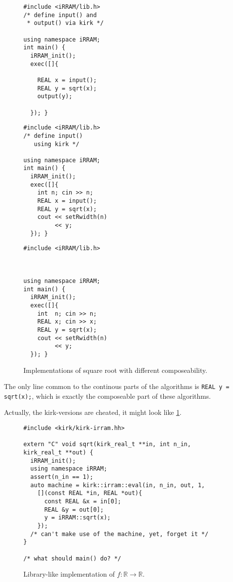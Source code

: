 \documentclass[a4paper,parskip=half]{scrartcl}
\begin{document}
\begin{figure}[h]
\small
\begin{minipage}[b]{.33\linewidth}
\begin{verbatim}
#include <iRRAM/lib.h>
/* define input() and
 * output() via kirk */

using namespace iRRAM;
int main() {
  iRRAM_init();
  exec([]{

    REAL x = input();
    REAL y = sqrt(x);
    output(y);

  }); }
\end{verbatim}
\end{minipage}%
\begin{minipage}[b]{.33\linewidth}
\begin{verbatim}
#include <iRRAM/lib.h>
/* define input()
   using kirk */

using namespace iRRAM;
int main() {
  iRRAM_init();
  exec([]{
    int n; cin >> n;
    REAL x = input();
    REAL y = sqrt(x);
    cout << setRwidth(n)
         << y;
  }); }
\end{verbatim}
\end{minipage}%
\begin{minipage}[b]{.33\linewidth}
\begin{verbatim}
#include <iRRAM/lib.h>



using namespace iRRAM;
int main() {
  iRRAM_init();
  exec([]{
    int  n; cin >> n;
    REAL x; cin >> x;
    REAL y = sqrt(x);
    cout << setRwidth(n)
         << y;
  }); }
\end{verbatim}
\end{minipage}
\caption{Implementations of square root with different composeability.}
\end{figure}
The only line common to the continous parts of the algorithms is
\verb!REAL y = sqrt(x);!, which is exactly the composeable part of these
algorithms.

Actually, the kirk-versions are cheated, it might look like \cref{fig:kirk-lib}.
\begin{figure}[H]
\begin{verbatim}
#include <kirk/kirk-irram.hh>

extern "C" void sqrt(kirk_real_t **in, int n_in, kirk_real_t **out) {
  iRRAM_init();
  using namespace iRRAM;
  assert(n_in == 1);
  auto machine = kirk::irram::eval(in, n_in, out, 1,
    [](const REAL *in, REAL *out){
      const REAL &x = in[0];
      REAL &y = out[0];
      y = iRRAM::sqrt(x);
    });
  /* can't make use of the machine, yet, forget it */
}

/* what should main() do? */
\end{verbatim}
\caption{Library-like implementation of $f:\mathbb R\to\mathbb R$.}
\label{fig:kirk-lib}
\end{figure}
\end{document}
